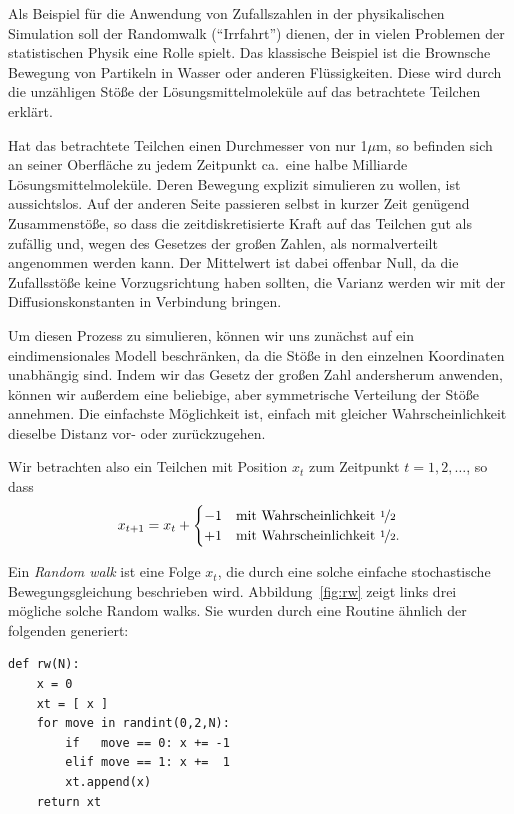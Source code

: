 Als Beispiel für die Anwendung von Zufallszahlen in der physikalischen
Simulation soll der Randomwalk ("`Irrfahrt"') dienen, der in vielen
Problemen der statistischen Physik eine Rolle spielt. Das klassische
Beispiel ist die Brownsche Bewegung von Partikeln in Wasser oder
anderen Flüssigkeiten. Diese wird durch die unzähligen Stöße der
Lösungsmittelmoleküle auf das betrachtete Teilchen erklärt.

Hat das betrachtete Teilchen einen Durchmesser von nur 1$\mu$m, so
befinden sich an seiner Oberfläche zu jedem Zeitpunkt ca.\ eine halbe
Milliarde Lösungsmittelmoleküle. Deren Bewegung explizit simulieren zu
wollen, ist aussichtslos. Auf der anderen Seite passieren selbst in
kurzer Zeit genügend Zusammenstöße, so dass die zeitdiskretisierte
Kraft auf das Teilchen gut als zufällig und, wegen des Gesetzes der
großen Zahlen, als normalverteilt angenommen werden kann. Der Mittelwert
ist dabei offenbar Null, da die Zufallsstöße keine Vorzugsrichtung
haben sollten, die Varianz werden wir mit der Diffusionskonstanten in
Verbindung bringen.

Um diesen Prozess zu simulieren, können wir uns zunächst auf ein
eindimensionales Modell beschränken, da die Stöße in den
einzelnen Koordinaten unabhängig sind. Indem wir das Gesetz der großen Zahl
andersherum anwenden, können wir außerdem eine beliebige, aber
symmetrische Verteilung der Stöße annehmen. Die einfachste Möglichkeit
ist, einfach mit gleicher Wahrscheinlichkeit dieselbe Distanz vor-
oder zurückzugehen.

Wir betrachten also ein Teilchen mit Position $x_t$ zum Zeitpunkt
$t=1, 2,\ldots$, so dass
\begin{equation}
  \label{eq:rw}
  x_{t+1} = x_t +
  \begin{cases}
    -1 & \text{mit Wahrscheinlichkeit \nicefrac{1}{2}}\\
    +1 & \text{mit Wahrscheinlichkeit \nicefrac{1}{2}}.
  \end{cases}
\end{equation}

Ein \emph{Random walk} ist eine Folge $x_t$, die durch eine solche
einfache stochastische Bewegungsgleichung beschrieben wird.
Abbildung~\ref{fig:rw} zeigt links drei mögliche solche Random
walks. Sie wurden durch eine Routine ähnlich der folgenden generiert: 
\begin{lstlisting}
def rw(N):
    x = 0
    xt = [ x ] 
    for move in randint(0,2,N):
        if   move == 0: x += -1
        elif move == 1: x +=  1
        xt.append(x)
    return xt
\end{lstlisting}

